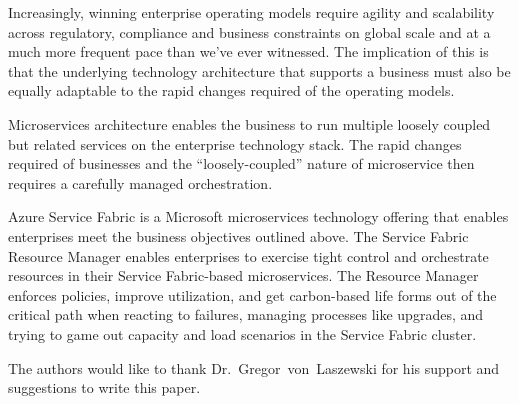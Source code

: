 Increasingly, winning enterprise operating models require agility and
scalability across regulatory, compliance and business constraints on
global scale and at a much more frequent pace than we’ve ever
witnessed. The implication of this is that the underlying technology
architecture that supports a business must also be equally adaptable
to the rapid changes required of the operating models.

Microservices architecture enables the business to run multiple
loosely coupled but related services on the enterprise technology
stack. The rapid changes required of businesses and the
``loosely-coupled'' nature of microservice then requires a carefully
managed orchestration.

Azure Service Fabric is a Microsoft microservices technology offering
that enables enterprises meet the business objectives outlined
above. The Service Fabric Resource Manager enables enterprises to
exercise tight control and orchestrate resources in their Service
Fabric-based microservices. The Resource Manager enforces policies,
improve utilization, and get carbon-based life forms out of the
critical path when reacting to failures, managing processes like
upgrades, and trying to game out capacity and load scenarios in the
Service Fabric cluster.


\begin{acks}

  The authors would like to thank Dr.~Gregor~von~Laszewski for his
  support and suggestions to write this paper.

\end{acks}



